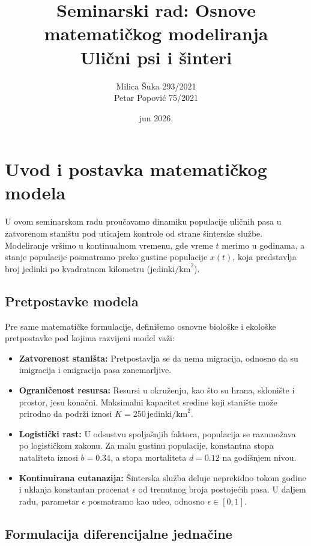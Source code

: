 \documentclass[12pt]{article}
\title{Seminarski rad: Osnove matematičkog modeliranja\\ Ulični psi i šinteri}
\author{Milica Šuka 293/2021 \\ Petar Popović 75/2021}
\date{jun 2026.}
\begin{document}
\maketitle

\section{Uvod i postavka matematičkog modela}

U ovom seminarskom radu proučavamo dinamiku populacije uličnih pasa u zatvorenom staništu pod uticajem kontrole od strane šinterske službe. Modeliranje vršimo u kontinualnom vremenu, gde vreme $t$ merimo u godinama, a stanje populacije posmatramo preko gustine populacije $x(t)$, koja predstavlja broj jedinki po kvadratnom kilometru ($\text{jedinki/km}^2$).

\subsection{Pretpostavke modela}

Pre same matematičke formulacije, definišemo osnovne biološke i ekološke pretpostavke pod kojima razvijeni model važi:
\begin{itemize}
    \item \textbf{Zatvorenost staništa:} Pretpostavlja se da nema migracija, odnosno da su imigracija i emigracija pasa zanemarljive.
    \item \textbf{Ograničenost resursa:} Resursi u okruženju, kao što su hrana, sklonište i prostor, jesu konačni. Maksimalni kapacitet sredine koji stanište može prirodno da podrži iznosi $K = 250 \, \text{jedinki/km}^2$.
    \item \textbf{Logistički rast:} U odsustvu spoljašnjih faktora, populacija se razmnožava po logističkom zakonu. Za malu gustinu populacije, konstantna stopa nataliteta iznosi $b = 0.34$, a stopa mortaliteta $d = 0.12$ na godišnjem nivou.
    \item \textbf{Kontinuirana eutanazija:} Šinterska služba deluje neprekidno tokom godine i uklanja konstantan procenat $\epsilon$ od trenutnog broja postojećih pasa. U daljem radu, parametar $\epsilon$ posmatramo kao udeo, odnosno $\epsilon \in [0,1]$.
\end{itemize}

\subsection{Formulacija diferencijalne jednačine}
\end{document}

